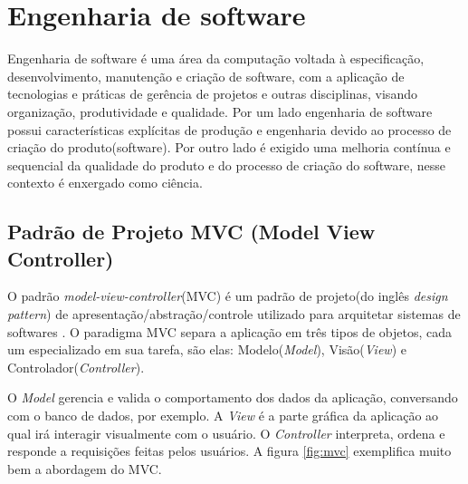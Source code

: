 
\section{Engenharia de software}

Engenharia de software é uma área da computação voltada à especificação, desenvolvimento, manutenção e criação de software, com a  aplicação de tecnologias e práticas de gerência de projetos e outras disciplinas, visando organização, produtividade e qualidade\cite{engenhariawikipedia}. Por um lado engenharia de software possui características explícitas de produção e engenharia devido ao processo de criação do produto(software). Por outro lado é exigido uma melhoria contínua e sequencial da qualidade do produto e do processo de criação do software, nesse contexto é enxergado como ciência\cite{travassos2002introducao}.



\subsection{Padrão de Projeto MVC (Model View Controller)}
\label{subsec:thresholding}

O padrão \textit{model-view-controller}(MVC) é um padrão de projeto(do inglês \textit{design pattern}) de apresentação/abstração/controle utilizado para arquitetar sistemas de softwares \cite{leff2001webmvc}. O paradigma MVC separa a aplicação em três tipos de objetos, cada um especializado em sua tarefa, são elas: Modelo(\textit{Model}), Visão(\textit{View}) e Controlador(\textit{Controller}). \par
O \textit{Model} gerencia e valida o comportamento dos dados da aplicação, conversando com o banco de dados, por exemplo. A \textit{View} é a parte gráfica da aplicação ao qual irá interagir visualmente com o usuário. O \textit{Controller} interpreta, ordena e responde a requisições feitas pelos usuários\cite{burbeck1997applications}. A figura \ref{fig:mvc} exemplifica muito bem a abordagem do MVC. \par

